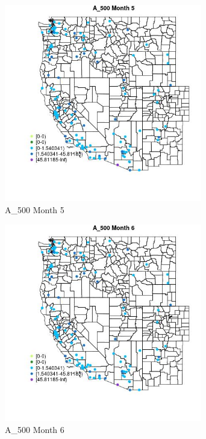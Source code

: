\begin{figure} 
\centering  
\includegraphics[width=0.77\textwidth]{Code_Outputs/Report_ML_input_PM25_Step4_part_e_de_duplicated_aves_MapObsMo5A_500.jpg} 
\caption{\label{fig:Report_ML_input_PM25_Step4_part_e_de_duplicated_avesMapObsMo5A_500}A_500 Month 5} 
\end{figure} 
 

\clearpage 

\begin{figure} 
\centering  
\includegraphics[width=0.77\textwidth]{Code_Outputs/Report_ML_input_PM25_Step4_part_e_de_duplicated_aves_MapObsMo6A_500.jpg} 
\caption{\label{fig:Report_ML_input_PM25_Step4_part_e_de_duplicated_avesMapObsMo6A_500}A_500 Month 6} 
\end{figure} 
 

